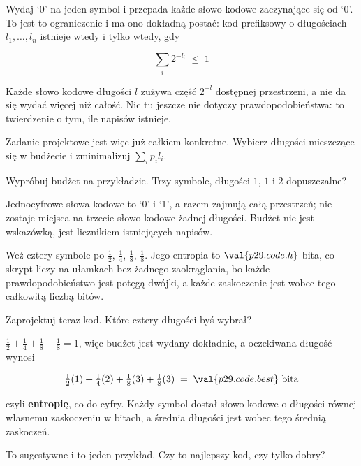 \begin{fr}

Wydaj `0' na jeden symbol i przepada każde słowo kodowe zaczynające się od
`0'. To jest to ograniczenie i ma ono dokładną postać: kod prefiksowy o
długościach $l_1, \ldots, l_n$ istnieje wtedy i tylko wtedy, gdy

\[ \sum_i 2^{-l_i} \;\le\; 1 \]

Każde słowo kodowe długości $l$ zużywa część $2^{-l}$ dostępnej przestrzeni, a
nie da się wydać więcej niż całość. Nic tu jeszcze nie dotyczy
prawdopodobieństwa: to twierdzenie o tym, ile napisów istnieje.

Zadanie projektowe jest więc już całkiem konkretne. Wybierz długości mieszczące
się w budżecie i zminimalizuj $\sum_i p_i l_i$.


Wypróbuj budżet na przykładzie. Trzy symbole, długości $1$, $1$ i $2$ \dash{}
dopuszczalne?
\dotline
\nextframe
\end{fr}

\begin{fr}

Jednocyfrowe słowa kodowe to `0' i `1', a razem zajmują całą przestrzeń; nie
zostaje miejsca na trzecie słowo kodowe żadnej długości. Budżet nie jest
wskazówką, jest licznikiem istniejących napisów.

Weź cztery symbole po $\frac{1}{2}$, $\frac{1}{4}$, $\frac{1}{8}$,
$\frac{1}{8}$. Jego entropia to $\val{p29.code.h}$ bita, co skrypt liczy na
ułamkach bez żadnego zaokrąglania, bo każde prawdopodobieństwo jest potęgą
dwójki, a każde zaskoczenie jest wobec tego całkowitą liczbą bitów.

Zaprojektuj teraz kod. Które cztery długości byś wybrał?
\dotline
\nextframe
\end{fr}

\begin{fr}

$\frac12 + \frac14 + \frac18 + \frac18 = 1$, więc budżet jest wydany dokładnie,
a oczekiwana długość wynosi

\[ \tfrac12(1) + \tfrac14(2) + \tfrac18(3) + \tfrac18(3)
   \;=\; \val{p29.code.best}\ \text{bita} \]

czyli \textbf{entropię}, co do cyfry. Każdy symbol dostał słowo kodowe o
długości równej własnemu zaskoczeniu w bitach, a średnia długości jest wobec
tego średnią zaskoczeń.

To sugestywne i to jeden przykład. Czy to najlepszy kod, czy tylko dobry?
\dotline
\nextframe
\end{fr}

